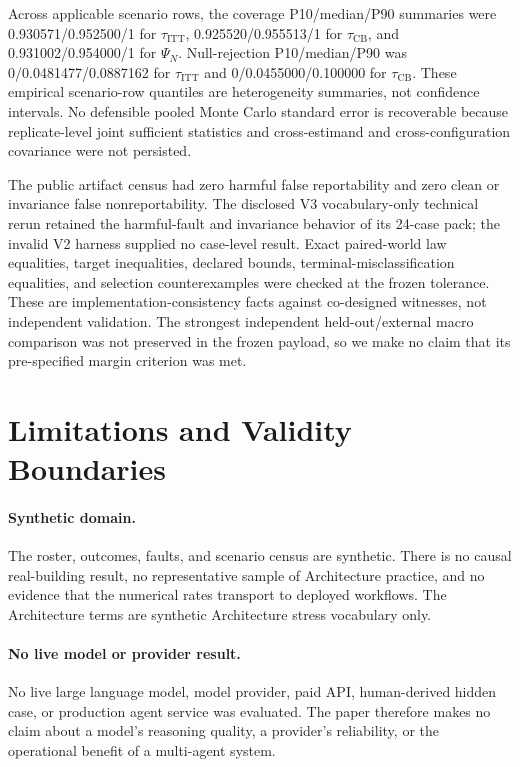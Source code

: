 \documentclass{article}
\begin{document}
Across applicable scenario rows, the coverage P10/median/P90 summaries were 0.930571/0.952500/1 for $\tau_{\mathrm{ITT}}$, 0.925520/0.955513/1 for $\tau_{\mathrm{CB}}$, and 0.931002/0.954000/1 for $\Psi_N$. Null-rejection P10/median/P90 was 0/0.0481477/0.0887162 for $\tau_{\mathrm{ITT}}$ and 0/0.0455000/0.100000 for $\tau_{\mathrm{CB}}$. These empirical scenario-row quantiles are heterogeneity summaries, not confidence intervals. No defensible pooled Monte Carlo standard error is recoverable because replicate-level joint sufficient statistics and cross-estimand and cross-configuration covariance were not persisted.

The public artifact census had zero harmful false reportability and zero clean or invariance false nonreportability. The disclosed V3 vocabulary-only technical rerun retained the harmful-fault and invariance behavior of its 24-case pack; the invalid V2 harness supplied no case-level result. Exact paired-world law equalities, target inequalities, declared bounds, terminal-misclassification equalities, and selection counterexamples were checked at the frozen tolerance. These are implementation-consistency facts against co-designed witnesses, not independent validation. The strongest independent held-out/external macro comparison was not preserved in the frozen payload, so we make no claim that its pre-specified margin criterion was met.

\section{Limitations and Validity Boundaries}
\label{sec:limitations}

\paragraph{Synthetic domain.}
The roster, outcomes, faults, and scenario census are synthetic. There is no causal real-building result, no representative sample of Architecture practice, and no evidence that the numerical rates transport to deployed workflows. The Architecture terms are synthetic Architecture stress vocabulary only.

\paragraph{No live model or provider result.}
No live large language model, model provider, paid API, human-derived hidden case, or production agent service was evaluated. The paper therefore makes no claim about a model's reasoning quality, a provider's reliability, or the operational benefit of a multi-agent system.
\end{document}
